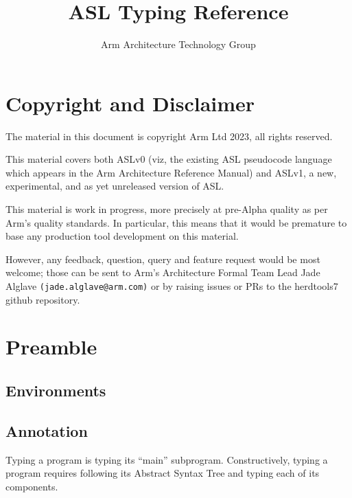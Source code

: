\documentclass{book}
\author{Arm Architecture Technology Group}
\title{ASL Typing Reference}
\begin{document}
\maketitle
\tableofcontents{}

\chapter{Copyright and Disclaimer}

The material in this document is copyright Arm Ltd 2023, all rights reserved.

This material covers both ASLv0 (viz, the existing ASL pseudocode language
which appears in the Arm Architecture Reference Manual) and ASLv1, a new,
experimental, and as yet unreleased version of ASL.

This material is work in progress, more precisely at pre-Alpha quality as
per Arm’s quality standards. In particular, this means that it would be
premature to base any production tool development on this material.

However, any feedback, question, query and feature request would be most
welcome; those can be sent to Arm’s Architecture Formal Team Lead Jade
Alglave \texttt{(jade.alglave@arm.com)} or by raising issues or PRs to the herdtools7
github repository.

\chapter{Preamble}

\section{Environments}

\section{Annotation}
Typing a program is typing its ``main'' subprogram.  Constructively, typing a
program requires following its Abstract Syntax Tree and typing each of its
components.
\end{document}
